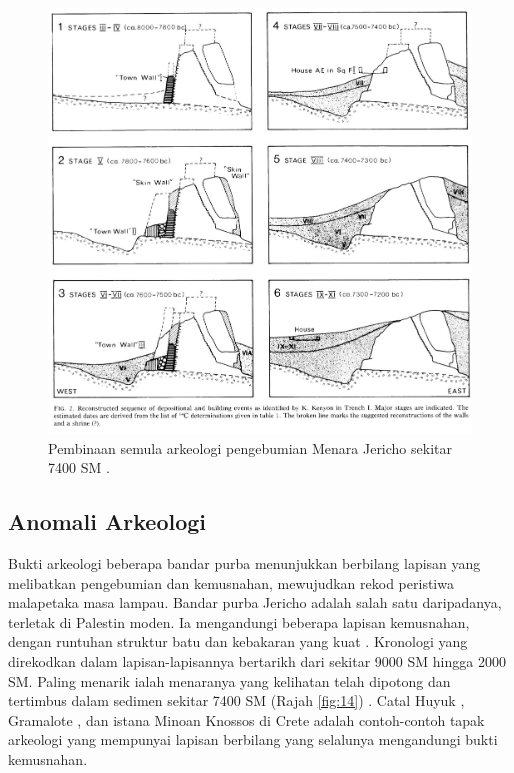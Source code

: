 \documentclass[10pt,twocolumn,letterpaper]{article}
\begin{document}
\begin{figure}[b]
\begin{center}

\includegraphics[width=1\linewidth]{jericho.jpg}
\end{center}
   \caption{Pembinaan semula arkeologi pengebumian Menara Jericho sekitar 7400 SM \cite{95}.}
\label{fig:14}
\label{fig:onecol}
\end{figure}

\subsection{Anomali Arkeologi}

Bukti arkeologi beberapa bandar purba menunjukkan berbilang lapisan yang melibatkan pengebumian dan kemusnahan, mewujudkan rekod peristiwa malapetaka masa lampau. Bandar purba Jericho adalah salah satu daripadanya, terletak di Palestin moden. Ia mengandungi beberapa lapisan kemusnahan, dengan runtuhan struktur batu dan kebakaran yang kuat \cite{96,97}. Kronologi yang direkodkan dalam lapisan-lapisannya bertarikh dari sekitar 9000 SM hingga 2000 SM. Paling menarik ialah menaranya yang kelihatan telah dipotong dan tertimbus dalam sedimen sekitar 7400 SM (Rajah \ref{fig:14}) \cite{95}. Catal Huyuk \cite{99}, Gramalote \cite{98}, dan istana Minoan Knossos di Crete \cite{100,101} adalah contoh-contoh tapak arkeologi yang mempunyai lapisan berbilang yang selalunya mengandungi bukti kemusnahan.
\end{document}
